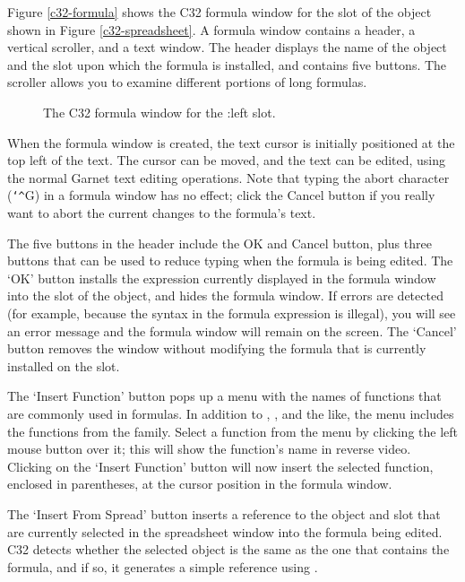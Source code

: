 Figure \ref{c32-formula} shows the C32 formula window for the
 slot of the object shown in Figure \ref{c32-spreadsheet}.
A formula window contains a header, a vertical scroller, and a text
window.  The header displays the name of the object and the slot upon
which the formula is installed, and contains five buttons.  The
scroller allows you to examine different portions of long formulas.

\begin{figure}
\begin{center}
\end{center}
\caption{The C32 formula window for the :left slot.}
\end{figure}



When the formula window is created, the text cursor is initially
positioned at the top left of the text.  The cursor can be moved, and the
text can be edited, using the normal Garnet text editing operations.  Note
that typing the abort character ({\tt\char`\^}G) in a formula window has no effect;
click the Cancel button if you really want to abort the current changes to
the formula's text.

The five buttons in the header include the OK and Cancel button, plus
three buttons that can be used to reduce typing when the formula is being
edited.  The `OK' button installs the expression currently displayed in the
formula window into the slot of the object, and hides the formula window.
If errors are detected (for example, because the syntax in the formula
expression is illegal), you will see an error message and the formula
window will remain on the screen.  The `Cancel' button removes the window
without modifying the formula that is currently installed on the slot.

The `Insert Function' button pops up a menu with the names of functions
that are commonly used in formulas.  In addition to , ,
and the like, the menu includes the functions from the 
family.  Select a function from the menu by clicking the left mouse button
over it; this will show the function's name in reverse video.  Clicking on
the `Insert Function' button will now insert the selected function,
enclosed in parentheses, at the cursor position in the formula window.

The `Insert From Spread' button inserts a reference to the object and slot
that are currently selected in the spreadsheet window into the formula
being edited.  C32 detects whether the selected object is the same as the
one that contains the formula, and if so, it generates a simple reference
using .

